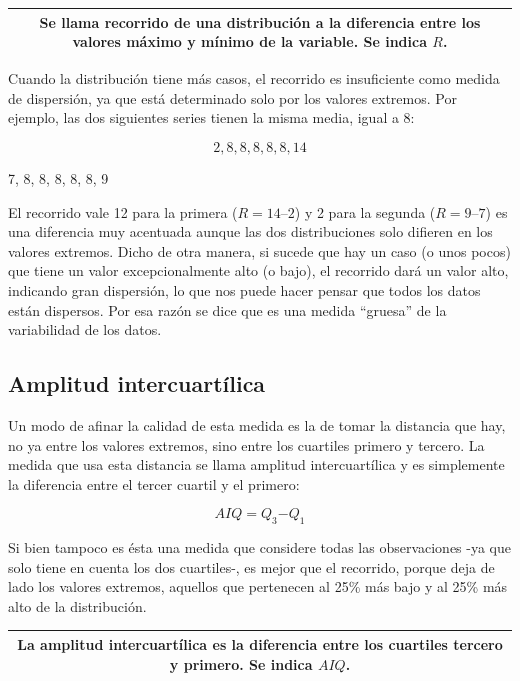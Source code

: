 \documentclass[]{book}
\begin{document}
\begin{longtable}[]{@{}c@{}}
\toprule
\endhead
\begin{minipage}[t]{0.97\columnwidth}\centering
Se llama \textbf{recorrido} de una distribución a la diferencia entre los valores máximo y mínimo de la variable. Se indica \(R\).\strut
\end{minipage}\tabularnewline
\bottomrule
\end{longtable}

Cuando la distribución tiene más casos, el recorrido es insuficiente
como medida de dispersión, ya que está determinado solo por los valores
extremos. Por ejemplo, las dos siguientes series tienen la misma media,
igual a 8:

\[2, 8, 8, 8, 8, 8, 14\]

7, 8, 8, 8, 8, 8, 9

El recorrido vale 12 para la primera (\(R=14–2\)) y 2 para la segunda
(\(R=9–7\)) es una diferencia muy acentuada aunque las dos distribuciones
solo difieren en los valores extremos. Dicho de otra manera, si sucede
que hay un caso (o unos pocos) que tiene un valor excepcionalmente alto
(o bajo), el recorrido dará un valor alto, indicando gran dispersión, lo
que nos puede hacer pensar que todos los datos están dispersos. Por esa
razón se dice que es una medida ``gruesa'' de la variabilidad de los
datos.

\hypertarget{amplitud-intercuartuxedlica}{%
\subsection{Amplitud intercuartílica}\label{amplitud-intercuartuxedlica}}

Un modo de afinar la calidad de esta medida es la de tomar la distancia
que hay, no ya entre los valores extremos, sino entre los cuartiles
primero y tercero. La medida que usa esta distancia se llama amplitud
intercuartílica y es simplemente la diferencia entre el tercer cuartil y
el primero:

\[AIQ = Q_{3}{- Q}_{1}\]

Si bien tampoco es ésta una medida que considere todas las observaciones
-ya que solo tiene en cuenta los dos cuartiles-, es mejor que el
recorrido, porque deja de lado los valores extremos, aquellos que
pertenecen al 25\% más bajo y al 25\% más alto de la distribución.

\begin{longtable}[]{@{}c@{}}
\toprule
\endhead
\begin{minipage}[t]{0.97\columnwidth}\centering
La \textbf{amplitud intercuartílica} es la diferencia entre los cuartiles tercero y primero. Se indica \(AIQ\).\strut
\end{minipage}\tabularnewline
\bottomrule
\end{longtable}
\end{document}
